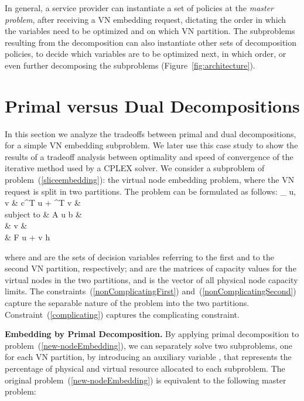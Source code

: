 \documentclass[a4paper, 10pt, conference]{ieeeconf}
\begin{document}
In general, a service provider can instantiate a set of policies at the {\it master problem}, after receiving a VN embedding request,  dictating the order in which the variables need to be optimized and on which VN partition. The subproblems resulting from the decomposition can also instantiate other sets of decomposition policies, to decide which variables are to be optimized next, in which order, or even further decomposing the subproblems (Figure~\ref{fig:architecture}).





\section{Primal versus Dual Decompositions}\label{sec:primalVsDual}

In this section we analyze the tradeoffs between primal and dual decompositions, for a simple VN embedding subproblem. We later use this case study to show the results of a tradeoff analysis between optimality and speed of convergence of the iterative method used by a CPLEX solver.
We consider a subproblem of problem~(\ref{sliceembedding}): the virtual node embedding problem, 
where the VN request is split in two partitions. The problem can be formulated as follows:
\vspace{-2mm}
 \nonumber
{\rm \displaystyle\max_{ u,  v} } &  c^{T} u + ^{T} v & \\  
{\rm  subject \; \rm to} & A u  \leq b &   \label{nonComplicatingFirst}\\
&		              v   \leq {} &  \label{nonComplicatingSecond}  \\
&				 F u +  v \leq h  \label{complicating}
 
where  and  are the sets of decision variables referring to the first and to the second VN partition, respectively;   and  are the matrices of capacity values for the virtual nodes in the two partitions, and  is the vector of all physical node capacity limits.
The constraints~(\ref{nonComplicatingFirst}) and~(\ref{nonComplicatingSecond}) capture the separable nature of the problem into the two partitions. Constraint~(\ref{complicating}) captures the complicating constraint. 
\vspace{1mm}


\noindent
{\bf Embedding by Primal Decomposition.} By applying primal decomposition to problem~(\ref{new-nodeEmbedding}), we can separately solve two subproblems, one for each VN partition, by introducing an auxiliary variable , that represents the percentage of physical and virtual resource allocated to each subproblem. The original problem~(\ref{new-nodeEmbedding}) is equivalent to the following master problem:
\vspace{-2mm}
 
\end{document}
